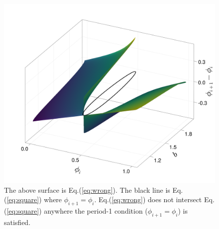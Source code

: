\begin{figure}[H]
    \begin{center}
    \includegraphics[width=.7\textwidth]{../plots/eqs18_fig.png}
    \end{center}
    \caption{The above surface is Eq.(\ref{eq:wrong}). The black line is Eq.(\ref{eq:square}) where $\phi_{i+1}=\phi_i$. Eq.(\ref{eq:wrong}) does not intersect Eq.(\ref{eq:square}) anywhere the period-1 condition ($\phi_{i+1}=\phi_i$) is satisfied.}
    \label{instabbound_restric}
\end{figure}

